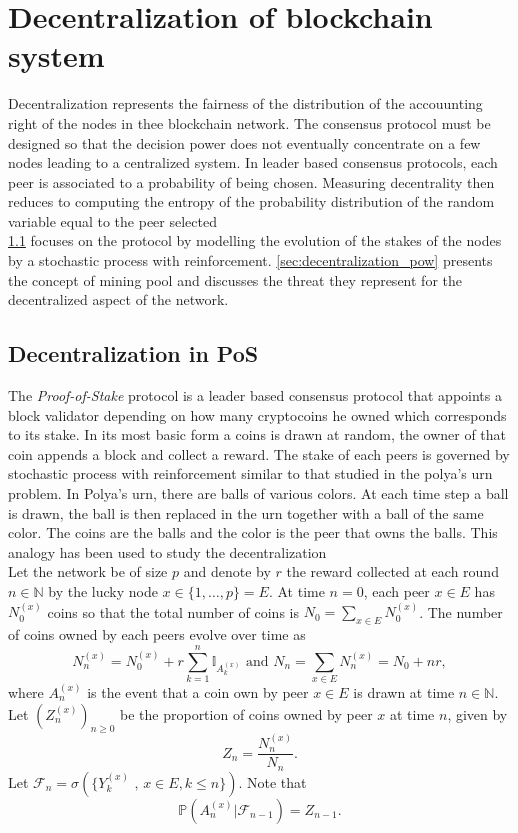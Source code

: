 \chapter{Decentralization of blockchain system}\label{chap:decentralization}
Decentralization represents the fairness of the distribution of the accouunting right of the nodes in thee blockchain network. The consensus protocol must be designed so that the decision power does not eventually concentrate on a few nodes leading to a centralized system. In leader based consensus protocols, each peer is associated to a probability of being chosen. Measuring decentrality then reduces to computing the entropy of the probability distribution of the random variable equal to the peer selected  \\

\noindent \cref{sec:decentralization_pos} focuses on the \PoS protocol by modelling the evolution of the stakes of the nodes by a stochastic process with reinforcement. \cref{sec:decentralization_pow} presents the concept of mining pool and discusses the threat they represent for the decentralized aspect of the network.

\section{Decentralization in PoS}\label{sec:decentralization_pos}
The \textit{Proof-of-Stake} protocol is a leader based consensus protocol that appoints a block validator depending on how many cryptocoins he owned which corresponds to its stake. In its most basic form a coins is drawn at random, the owner of that coin appends a block and collect a reward. The stake of each peers is governed by stochastic process with reinforcement similar to that studied in the polya's urn problem. In Polya's urn, there are balls of various colors. At each time step a ball is drawn, the ball is then replaced in the urn together with a ball of the same color. The coins are the balls and the color is the peer that owns the balls. This analogy has been used to study the decentralization\\

\noindent Let the network be of size $p$ and denote by $r$ the reward collected at each round $n\in\mathbb{N}$ by the lucky node $x\in \{1, \ldots, p\} = E$. At time $n=0$, each peer $x\in E$ has $N^{(x)}_0$ coins so that the total number of coins is $N_0 = \sum_{x\in E}N^{(x)}_0$. The number of coins owned by each peers evolve over time as
$$
N^{(x)}_n = N^{(x)}_0 + r\sum_{k = 1}^n\mathbb{I}_{A_{k}^{(x)}}\text{ and }N_n = \sum_{x\in E}N^{(x)}_n = N_0 + nr,    
$$
where $A_{n}^{(x)}$ is the event that a coin own by peer $x\in E$ is drawn at time $n\in\mathbb{N}$. Let $(Z_n^{(x)})_{n\geq0}$ be the proportion of coins owned by peer $x$ at time $n$, given by 
$$
Z_n = \frac{N^{(x)}_n}{N_n}. 
$$
Let $\mathcal{F}_n = \sigma(\{Y_k^{(x)}\text{ , }x\in E, k\leq n\})$. Note that 
$$
\mathbb{P}\left(A_{n}^{(x)}|\mathcal{F}_{n-1}\right) = Z_{n-1}.
$$
